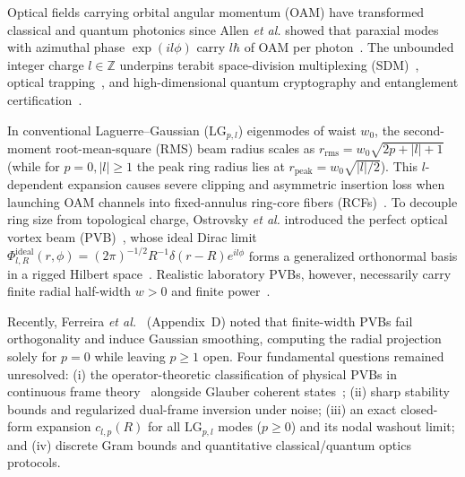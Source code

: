 \documentclass[aps,pra,onecolumn,notitlepage,11pt,tightenlines,amsmath,amssymb,floatfix,longbibliography]{revtex4-2}
\providecommand{\abs}[1]{\lvert#1\rvert}
\begin{document}
Optical fields carrying orbital angular momentum (OAM) have transformed classical and quantum photonics since Allen \emph{et al.} showed that paraxial modes with azimuthal phase $\exp(il\phi)$ carry $l\hbar$ of OAM per photon~\cite{Allen1992}. The unbounded integer charge $l \in \mathbb{Z}$ underpins terabit space-division multiplexing (SDM)~\cite{Bozinovic2013,Willner2015,Wang2019}, optical trapping~\cite{Padgett2011}, and high-dimensional quantum cryptography and entanglement certification~\cite{Cerf2002,Mirhosseini2015,Bavaresco2018,Erhard2018}.

In conventional Laguerre--Gaussian ($\mathrm{LG}_{p,l}$) eigenmodes of waist $w_0$, the second-moment root-mean-square (RMS) beam radius scales as $r_{\mathrm{rms}} = w_0\sqrt{2p+\abs{l}+1}$~\cite{Allen1992,Siegman1986} (while for $p=0,\abs{l}\ge 1$ the peak ring radius lies at $r_{\mathrm{peak}} = w_0\sqrt{\abs{l}/2}$). This $l$-dependent expansion causes severe clipping and asymmetric insertion loss when launching OAM channels into fixed-annulus ring-core fibers (RCFs)~\cite{Ramachandran2009,Brunet2014,Gregg2015,Canas2021,RojasRojas2021,Villalba2023}. To decouple ring size from topological charge, Ostrovsky \emph{et al.} introduced the perfect optical vortex beam (PVB)~\cite{Ostrovsky2013,Vaity2015}, whose ideal Dirac limit $\Phi_{l,R}^{\mathrm{ideal}}(r,\phi) = (2\pi)^{-1/2} R^{-1}\delta(r-R)e^{il\phi}$ forms a generalized orthonormal basis in a rigged Hilbert space~\cite{Gelfand1964}. Realistic laboratory PVBs, however, necessarily carry finite radial half-width $w > 0$ and finite power~\cite{Vaity2015,Reddy2016}.

Recently, Ferreira \emph{et al.}~\cite{Ferreira2026} (Appendix~D) noted that finite-width PVBs fail orthogonality and induce Gaussian smoothing, computing the radial projection solely for $p=0$ while leaving $p \ge 1$ open. Four fundamental questions remained unresolved: (i) the operator-theoretic classification of physical PVBs in continuous frame theory~\cite{Duffin1952,Daubechies1990,Ali1993,Christensen2016} alongside Glauber coherent states~\cite{Klauder1985,Perelomov1986,Gazeau2009}; (ii) sharp stability bounds and regularized dual-frame inversion under noise; (iii) an exact closed-form expansion $c_{l,p}(R)$ for all $\mathrm{LG}_{p,l}$ modes ($p \ge 0$) and its nodal washout limit; and (iv) discrete Gram bounds and quantitative classical/quantum optics protocols.
\end{document}
